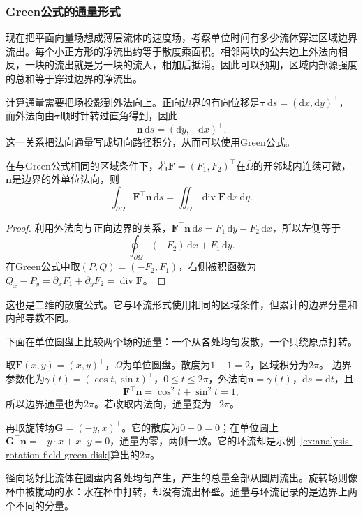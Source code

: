 \subsubsection{Green公式的通量形式}

现在把平面向量场想成薄层流体的速度场，考察单位时间有多少流体穿过区域边界流出。每个小正方形的净流出约等于散度乘面积。相邻两块的公共边上外法向相反，一块的流出就是另一块的流入，相加后抵消。因此可以预期，区域内部源强度的总和等于穿过边界的净流出。

计算通量需要把场投影到外法向上。正向边界的有向位移是$\bm\tau\,\mathrm ds=(\mathrm dx,\mathrm dy)^\top$，而外法向由$\bm\tau$顺时针转过直角得到，因此
\[
 \bm n\,\mathrm ds=(\mathrm dy,-\mathrm dx)^\top.
\]
这一关系把法向通量写成切向路径积分，从而可以使用Green公式。
\begin{theorem}[平面区域的通量公式]
\label{thm:multivariable-planar-flux}
在与Green公式相同的区域条件下，若$\bm F=(F_1,F_2)^\top$在$\overline\Omega$的开邻域内连续可微，
$\bm n$是边界的外单位法向，则
\begin{equation}
 \int_{\partial\Omega}\bm F^\top\bm n\,\mathrm ds
 =\iint_\Omega\operatorname{div}\bm F\,\mathrm dx\,\mathrm dy.
 \label{eq:multivariable-planar-flux}
\end{equation}
\end{theorem}
\begin{proof}
利用外法向与正向边界的关系，$\bm F^\top\bm n\,\mathrm ds=F_1\,\mathrm dy-F_2\,\mathrm dx$，所以左侧等于
\[
 \oint_{\partial\Omega}(-F_2)\,\mathrm dx+F_1\,\mathrm dy.
\]
在Green公式中取$(P,Q)=(-F_2,F_1)$，右侧被积函数为$Q_x-P_y=\partial_xF_1+\partial_yF_2=\operatorname{div}\bm F$。
\end{proof}
这也是二维的散度公式。它与环流形式使用相同的区域条件，但累计的边界分量和内部导数不同。

下面在单位圆盘上比较两个场的通量：一个从各处均匀发散，一个只绕原点打转。
\begin{example}[单位圆盘上径向场与旋转场的通量]
取$\bm F(x,y)=(x,y)^\top$，$\Omega$为单位圆盘。散度为$1+1=2$，区域积分为$2\pi$。
边界参数化为$\gamma(t)=(\cos t,\sin t)^\top$，$0\leq t\leq2\pi$，外法向$\bm n=\gamma(t)$，$\mathrm ds=\mathrm dt$，且
\[
 \bm F^\top\bm n=\cos^2t+\sin^2t=1,
\]
所以边界通量也为$2\pi$。若改取内法向，通量变为$-2\pi$。

再取旋转场$\bm G=(-y,x)^\top$。它的散度为$0+0=0$；在单位圆上$\bm G^\top\bm n=-y\cdot x+x\cdot y=0$，通量为零，两侧一致。它的环流却是示例~\ref{ex:analysis-rotation-field-green-disk}算出的$2\pi$。
\end{example}
径向场好比流体在圆盘内各处均匀产生，产生的总量全部从圆周流出。旋转场则像杯中被搅动的水：水在杯中打转，却没有流出杯壁。通量与环流记录的是边界上两个不同的分量。

